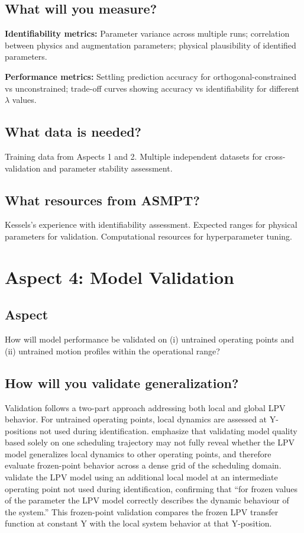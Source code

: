 \subsection{What will you measure?}

\textbf{Identifiability metrics:} Parameter variance across multiple runs; correlation between physics and augmentation parameters; physical plausibility of identified parameters.

\textbf{Performance metrics:} Settling prediction accuracy for orthogonal-constrained vs unconstrained; trade-off curves showing accuracy vs identifiability for different $\lambda$ values.

\subsection{What data is needed?}

Training data from Aspects 1 and 2. Multiple independent datasets for cross-validation and parameter stability assessment.

\subsection{What resources from ASMPT?}

Kessels's experience with identifiability assessment. Expected ranges for physical parameters for validation. Computational resources for hyperparameter tuning.

\section{Aspect 4: Model Validation}

\subsection*{Aspect}
How will model performance be validated on (i) untrained operating points and (ii) untrained motion profiles within the operational range?

\subsection{How will you validate generalization?}

Validation follows a two-part approach addressing both local and global LPV behavior. For untrained operating points, local dynamics are assessed at Y-positions not used during identification. \citet{bachnas2014review} emphasize that validating model quality based solely on one scheduling trajectory may not fully reveal whether the LPV model generalizes local dynamics to other operating points, and therefore evaluate frozen-point behavior across a dense grid of the scheduling domain. \citet{paijmans2008identification} validate the LPV model using an additional local model at an intermediate operating point not used during identification, confirming that ``for frozen values of the parameter the LPV model correctly describes the dynamic behaviour of the system.'' This frozen-point validation compares the frozen LPV transfer function at constant Y with the local system behavior at that Y-position.

